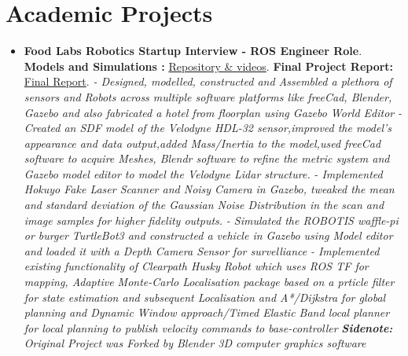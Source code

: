 \documentclass[a4paper,12pt]{article}
\begin{document}
\section*{Academic Projects}
\begin{itemize}
    \item{\textbf{\large{Food Labs Robotics Startup Interview - ROS Engineer Role}}.
          \newline
          \textbf{ Models and Simulations :} \href{https://github.com/teetangh/Kaustav-ROS-Workspace}{Repository \& videos}.
          \textbf{  Final Project Report:} \href{https://github.com/teetangh/Kaustav-ROS-Workspace/blob/master/Resources/Final%20Report.pdf}{Final Report}.
              \newline
              \textit{- Designed, modelled, constructed and
                  Assembled a plethora of sensors and Robots across multiple software platforms like
                  freeCad, Blender, Gazebo and also fabricated a hotel from floorplan using Gazebo World Editor}
              \newline
              \textit{- Created an SDF model of the Velodyne HDL-32 sensor,improved the model's appearance and data output,added Mass/Inertia to the model,used freeCad software to acquire Meshes, Blendr software to refine the metric system and Gazebo model editor to model the Velodyne Lidar structure.}
              \newline
              \textit{- Implemented Hokuyo Fake Laser Scanner and Noisy Camera in Gazebo, tweaked the mean and standard deviation of the Gaussian Noise Distribution in the scan and image samples for higher fidelity outputs.}
              \newline
              \textit{- Simulated the ROBOTIS waffle-pi or burger TurtleBot3 and constructed a vehicle in Gazebo using Model editor and loaded it with a Depth Camera Sensor for survelliance}
              \newline
              \textit{- Implemented existing functionality of Clearpath Husky Robot which uses ROS TF for mapping, Adaptive Monte-Carlo Localisation package based on a prticle filter for state estimation and subsequent Localisation and A*/Dijkstra for global planning and Dynamic Window approach/Timed Elastic Band local planner for local planning to publish velocity commands to base-controller}
              \newline
              \textit{\textbf{Sidenote:} Original Project was Forked by Blender 3D computer graphics software }}
          \newline


\end{itemize}
\end{document}

